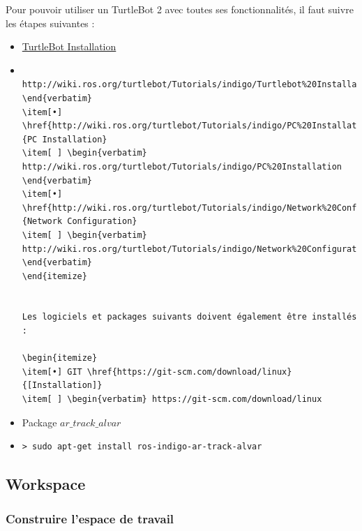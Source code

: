 \documentclass[10pt,a4paper]{article}
\begin{document}
Pour pouvoir utiliser un TurtleBot 2 avec toutes ses fonctionnalités, il faut suivre les étapes suivantes :

\begin{itemize}
\item[•] \href{http://wiki.ros.org/turtlebot/Tutorials/indigo/Turtlebot%20Installation}{TurtleBot Installation} 
\item[ ] \begin{verbatim} http://wiki.ros.org/turtlebot/Tutorials/indigo/Turtlebot%20Installation \end{verbatim}
\item[•] \href{http://wiki.ros.org/turtlebot/Tutorials/indigo/PC%20Installation}{PC Installation} 
\item[ ] \begin{verbatim} http://wiki.ros.org/turtlebot/Tutorials/indigo/PC%20Installation \end{verbatim}
\item[•] \href{http://wiki.ros.org/turtlebot/Tutorials/indigo/Network%20Configuration}{Network Configuration} 
\item[ ] \begin{verbatim} http://wiki.ros.org/turtlebot/Tutorials/indigo/Network%20Configuration \end{verbatim}
\end{itemize}


Les logiciels et packages suivants doivent également être installés :

\begin{itemize}
\item[•] GIT \href{https://git-scm.com/download/linux}{[Installation]} 
\item[ ] \begin{verbatim} https://git-scm.com/download/linux \end{verbatim}
\item[•] Package $ar\_track\_alvar$ 
\item[ ] \begin{verbatim}> sudo apt-get install ros-indigo-ar-track-alvar \end{verbatim}
\end{itemize}

\subsection{Workspace}
\label{sec:workspace}

\subsubsection{Construire l'espace de travail}
\end{document}
